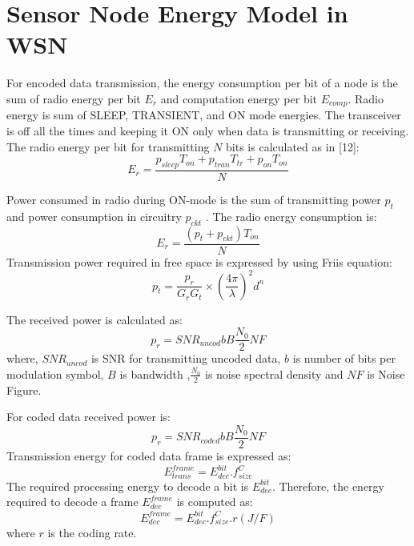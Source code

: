 \documentclass[3p,times,procedia]{elsarticle}
\begin{document}
\vspace{-0.5cm}
\section{Sensor Node Energy Model in WSN}
\label{sec:pagestyle}
\vspace{-0.3cm}

For encoded data transmission, the energy consumption per bit of a node is the sum of radio energy per bit $E_r$ and computation energy per bit $E_{comp}$.
Radio energy is sum of SLEEP, TRANSIENT, and ON mode energies. The transceiver is off all the times and keeping it ON only when data is
transmitting or receiving. The radio energy per bit for transmitting $N$ bits is calculated  as in [12]:
\vspace{-0.3cm}
\begin{equation}
E_r=\frac{p_{sleep}T_{on}+p_{tran}T_{tr}+p_{on}T_{on}}{N}
\end{equation}

Power consumed in radio during ON-mode is the sum of transmitting power $p_t$ and power consumption in circuitry $p_{ckt}$ .
The radio energy consumption is:
\vspace{-0.5cm}
\begin{equation}
E_r=\frac{(p_t+p_{ckt})T_{on}}{N}
\end{equation}
Transmission power required in free space is expressed by using Friis equation:
\vspace{-0.5cm}
\begin{equation}
p_t=\frac{p_r}{G_rG_t}\times(\frac{4\pi}{\lambda})^2d^n
\end{equation}



The received power is calculated as:
\vspace{-0.5cm}
\begin{equation}
p_r=SNR_{uncod}bB\frac{N_0}{2}NF
\end{equation}
where, $SNR_{uncod}$ is SNR for transmitting uncoded data, $b$ is number of bits per modulation symbol, $B$ is bandwidth ,$\frac{N_0}{2}$
is noise spectral density and $NF$ is Noise Figure.


For coded data received power is:
\vspace{-0.5cm}
\begin{equation}
p_r=SNR_{coded}bB\frac{N_0}{2}NF
\end{equation}
Transmission energy for coded data frame is expressed as:
\vspace{-0.4cm}
\begin{equation}
E_{trans}^{frame}=E_{dec}^{bit}.f_{size}^C
\end{equation}
The required processing energy to decode a bit is $E_{dec}^{bit}$. Therefore, the energy required to decode a frame $ E_{dec}^{frame}$ is computed as:
\vspace{-0.5cm}
\begin{equation}
E_{dec}^{frame}=E_{dec}^{bit}.f_{size}^C.r (J/F)
\end{equation}
where $r$ is the coding rate.
\end{document}
